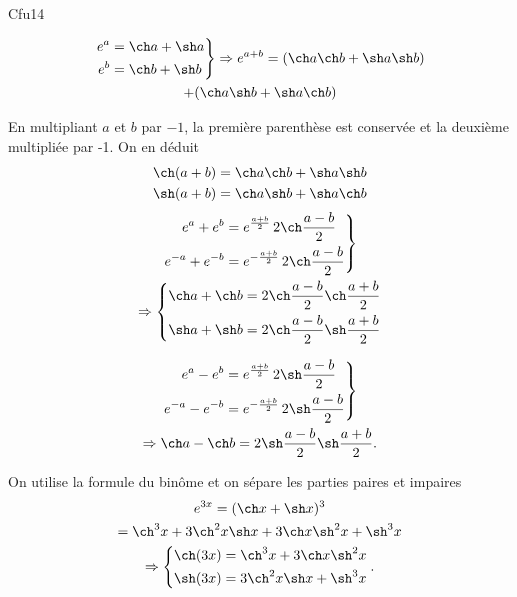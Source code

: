 \begin{tiny}Cfu14\end{tiny}
\begin{multline*}
  \left.
  \begin{aligned}
    e^a &= \ch a + \sh a \\ e^b &= \ch b + \sh b
  \end{aligned}
\right\rbrace 
\Rightarrow
e^{a + b}
= (\ch a \ch b + \sh a \sh b) \\ + (\ch a \sh b + \sh a \ch b) 
\end{multline*}

En multipliant $a$ et $b$ par $-1$, la première parenthèse est conservée et la deuxième multipliée par -1. On en déduit
\[
\begin{aligned}
\ch (a+b) &= \ch a \ch b + \sh a \sh b\\
\sh (a+b) &= \ch a \sh b + \sh a \ch b
\end{aligned}
\]
\begin{multline*}
\left.
  \begin{aligned}
  e^a + e^b &= e^{\frac{a+b}{2}}\,2\ch \frac{a-b}{2} \\
  e^{-a} + e^{-b} &= e^{-\frac{a+b}{2}}\,2\ch \frac{a-b}{2} 
  \end{aligned}
\right\rbrace \\
  \Rightarrow
\left\lbrace
\begin{aligned}
  \ch a + \ch b &= 2\ch \frac{a-b}{2} \ch \frac{a+b}{2} \\ \sh a + \sh b &= 2\ch \frac{a-b}{2} \sh \frac{a+b}{2}
\end{aligned}
\right.
\end{multline*}

\begin{multline*}
\left.
  \begin{aligned}
  e^a - e^b &= e^{\frac{a+b}{2}} \,2\sh \frac{a-b}{2} \\
  e^{-a} - e^{-b} &= e^{-\frac{a+b}{2}} \,2\sh \frac{a-b}{2} 
  \end{aligned}
\right\rbrace \\
  \Rightarrow
  \ch a - \ch b = 2\sh \frac{a-b}{2} \sh \frac{a+b}{2} .
\end{multline*}

On utilise la formule du binôme et on sépare les parties paires et impaires
\begin{multline*}
  e^{3x} = (\ch x + \sh x)^3\\
  = {\ch}^3x + 3 {\ch}^2x \sh x  + 3 \ch x {\sh}^2 x + {\sh}^3 x \\
  \Rightarrow
  \left\lbrace
  \begin{aligned}
    \ch(3x) &= {\ch}^3x  + 3 \ch x {\sh}^2 x \\
    \sh(3x) &= 3 {\ch}^2 x \sh x  + {\sh}^3 x
  \end{aligned}
\right. .
\end{multline*}
